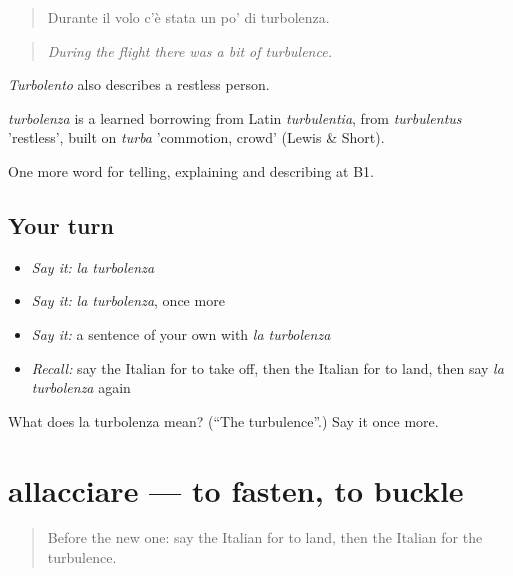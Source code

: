 \begin{quote}
Durante il volo c'è stata un po' di turbolenza.
\end{quote}

\begin{quote}
\emph{During the flight there was a bit of turbulence.}
\end{quote}

\emph{Turbolento} also describes a restless person.

\begin{cousinweb}
\emph{turbolenza} is a learned borrowing from Latin \emph{turbulentia}, from \emph{turbulentus} 'restless', built on \emph{turba} 'commotion, crowd' (Lewis \& Short).
\end{cousinweb}

\begin{grammarlens}[title={What you've built}]
One more word for telling, explaining and describing at B1.
\end{grammarlens}

\subsection*{Your turn}
\begin{itemize}
\raggedright
  \item \emph{Say it:} \emph{la turbolenza}
  \item \emph{Say it:} \emph{la turbolenza}, once more
  \item \emph{Say it:} a sentence of your own with \emph{la turbolenza}
  \item \emph{Recall:} say the Italian for to take off, then the Italian for to land, then say \emph{la turbolenza} again
\end{itemize}

\begin{tcolorbox}[breakable,colback=teal!4,colframe=teal!35!black,title={Before you move on}]
What does la turbolenza mean? (\textquotedblleft{}The turbulence\textquotedblright{}.) Say it once more.
\end{tcolorbox}
\section[allacciare]{allacciare — to fasten, to buckle}

\label{lesson:IT-C428-allacciare}



\begin{quote}
Before the new one: say the Italian for to land, then the Italian for the turbulence.
\end{quote}


